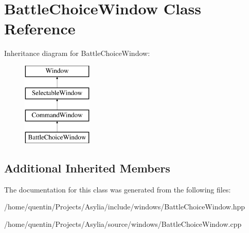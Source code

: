 \hypertarget{classBattleChoiceWindow}{\section{Battle\-Choice\-Window Class Reference}
\label{classBattleChoiceWindow}
}
Inheritance diagram for Battle\-Choice\-Window\-:\begin{figure}[H]
\begin{center}
\leavevmode
\includegraphics[height=4.000000cm]{classBattleChoiceWindow}
\end{center}
\end{figure}
\subsection*{Additional Inherited Members}


The documentation for this class was generated from the following files\-:\begin{DoxyCompactItemize}
\item 
/home/quentin/\-Projects/\-Asylia/include/windows/Battle\-Choice\-Window.\-hpp\item 
/home/quentin/\-Projects/\-Asylia/source/windows/Battle\-Choice\-Window.\-cpp\end{DoxyCompactItemize}

